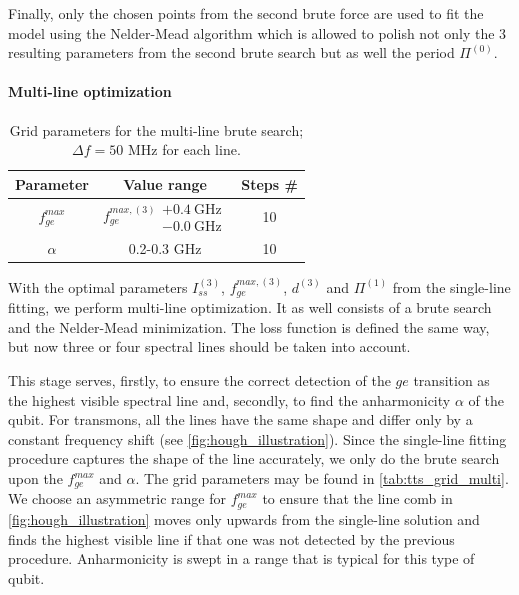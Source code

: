 \documentclass[%
 aip,
 amsmath,amssymb,
 reprint,%
]{revtex4-1}
\begin{document}
Finally, only the chosen points from the second brute force are used to fit the model using the Nelder-Mead algorithm which is allowed to polish not only the 3 resulting parameters from the second brute search but as well the period $\Pi^{(0)}$.

\paragraph{Multi-line optimization}

\begin{table}
	\centering
	\begin{ruledtabular}
		\begin{tabular}{ccc} 
			Parameter & Value range & Steps \# \\
			\hline
			$f_{ge}^{max}$ & $f_{ge}^{max, (3)}  \substack{+0.4\ \text{GHz} \\ -0.0\ \text{GHz}}$  & 10 \\
			$\alpha$ & 0.2-0.3 GHz & 10 
		\end{tabular} 
	\end{ruledtabular}
	\caption{Grid parameters for the multi-line brute search; $\Delta f = 50$ MHz for each line.}
	\label{tab:tts_grid_multi}
\end{table}

With the optimal parameters $I_{ss}^{(3)}$, $f_{ge}^{max, (3)}$, $d^{(3)}$ and $\Pi^{(1)}$ from the single-line fitting, we perform multi-line optimization. It as well consists of a brute search and the Nelder-Mead minimization. The loss function is defined the same way, but now three or four spectral lines should be taken into account.

This stage serves, firstly, to ensure the correct detection of the $ge$ transition as the highest visible spectral line and, secondly, to find the anharmonicity $\alpha$ of the qubit. For transmons, all the lines have the same shape and differ only by a constant frequency shift (see \autoref{fig:hough_illustration}). Since the single-line fitting procedure captures the shape of the line accurately, we only do the brute search upon the $f_{ge}^{max}$ and $\alpha$. The grid parameters may be found in \autoref{tab:tts_grid_multi}. We choose an asymmetric range for $f_{ge}^{max}$ to ensure that the line comb in \autoref{fig:hough_illustration} moves only upwards from the single-line solution and finds the highest visible line if that one was not detected by the previous procedure. Anharmonicity is swept in a range that is typical for this type of qubit.
\end{document}
